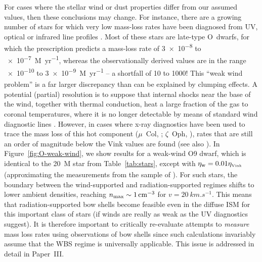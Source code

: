 For cases where the stellar wind or dust properties differ from our
assumed values, then these conclusions may change.  For instance,
there are a growing number of stars for which very low mass-loss rates
have been diagnosed from UV, optical or infrared line profiles
\citep{Martins:2005b, Marcolino:2009a, Najarro:2011a, Martins:2012a,
  Shenar:2017a, Smith:2017b}.  Most of these stars are late-type
O~dwarfs, for which the \citet{Vink:2000a} prescription predicts a
mass-loss rate of \num{3e-8} to \SI{e-7}{M_\odot.yr^{-1}}, whereas the
observationally derived values are in the range \num{e-10} to
\SI{3e-9}{M_\odot.yr^{-1}} -- a shortfall of 10 to 1000!  This ``weak wind
problem'' is a far larger discrepancy than can be explained by
clumping effects.  A potential (partial) resolution is to suppose that
internal shocks near the base of the wind, together with thermal
conduction, heat a large fraction of the gas to coronal temperatures,
where it is no longer detectable by means of standard wind diagnostic
lines \citep{Lucy:2012a}.  However, in cases where x-ray diagnostics
have been used to trace the mass loss of this hot component
(\(\mu\)~Col, \citealp{Huenemoerder:2012a}; \(\zeta\)~Oph,
\citealp{Cohen:2014a}), rates that are still an order of magnitude
below the Vink values are found (see also \citealp{Shenar:2017a}).  In
Figure~\ref{fig:O-weak-wind}, we show results for a weak-wind O9
dwarf, which is identical to the \SI{20}{M_\odot} star from
Table~\ref{tab:stars}, except with \(\eta_{\text{w}} = 0.01 \eta_{\text{\tiny Vink}}\)
(approximating the measurements from the sample of
\citealp{Martins:2005b}).  For such stars, the boundary between the
wind-supported and radiation-supported regimes shifts to lower ambient
densities, reaching \(n_{\text{max}} \sim \SI{1}{cm^{-3}}\) for
\(v = \SI{20}{km.s^{-1}}\).  This means that radiation-supported bow shells
become feasible even in the diffuse ISM for this important class of
stars (if winds are really as weak as the UV diagnostics suggest).  It
is therefore important to critically re-evaluate attempts to
\emph{measure} mass loss rates using observations of bow shells
\citep{Gvaramadze:2012a, Kobulnicky:2018a} since such calculations
invariably assume that the WBS regime is universally applicable.  This
issue is addressed in detail in Paper~III.

